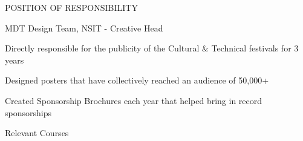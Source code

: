 \documentclass[../resume.tex]{subfiles}
\begin{document}
{\begin{rSection}{POSITION OF RESPONSIBILITY}
    \begin{rSubsection}
        {MDT Design Team, NSIT}
        {  -  }
        {Creative Head}{}

        \item Directly responsible for the publicity of the Cultural \& Technical festivals for 3 years
        \item Designed posters that have collectively reached an audience of 50,000+
        \item Created Sponsorship Brochures each year that helped bring in record sponsorships
    \end{rSubsection}

\end{rSection}

\begin{rSection}{Relevant Courses}
     \tab{}  
    \\  \tab{}  
    \\  \tab{}  
    \\  \tab{}  
\end{rSection}
}
\end{document}
